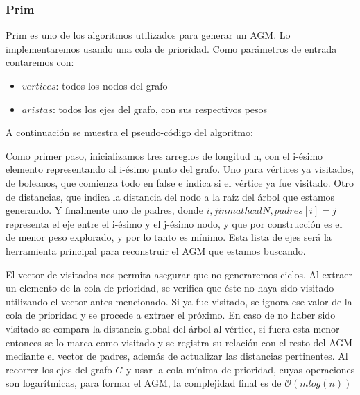 \subsubsection{Prim}
Prim es uno de los algoritmos utilizados para generar un AGM. Lo implementaremos usando una cola de prioridad.
Como parámetros de entrada contaremos con:

\begin{itemize}
	\item $vertices$: todos los nodos del grafo
	\item $aristas$: todos los ejes del grafo, con sus respectivos pesos
\end{itemize}

A continuación se muestra el pseudo-código del algoritmo:


Como primer paso, inicializamos tres arreglos de longitud n, con el i-ésimo elemento representando al i-ésimo punto del grafo.
Uno para vértices ya visitados, de boleanos, que comienza todo en false e indica si el vértice ya fue visitado.
Otro de distancias, que indica la distancia del nodo a la raíz del árbol que estamos generando.
Y finalmente uno de padres, donde $ i, j in mathcal{N}, padres[i]=j$ representa el eje entre el i-ésimo y el j-ésimo nodo, y que por construcción es el de menor peso explorado, y por lo tanto es mínimo. Esta lista de ejes será la herramienta principal para reconstruir el AGM que estamos buscando.

El vector de visitados nos permita asegurar que no generaremos ciclos. Al extraer un elemento de la cola de prioridad, se verifica que éste no haya sido visitado utilizando el vector antes mencionado. Si ya fue visitado, se ignora ese valor de la cola de prioridad y se procede a extraer el próximo. En caso de no haber sido visitado se compara la distancia global del árbol al vértice, si fuera esta menor entonces se lo marca como visitado y se registra su relación con el resto del AGM mediante el vector de padres, además de actualizar las distancias pertinentes. Al recorrer los ejes del grafo $G$ y usar la cola mínima de prioridad, cuyas operaciones son logarítmicas, para formar el AGM, la complejidad final es de $\mathcal{O}(m log(n))$